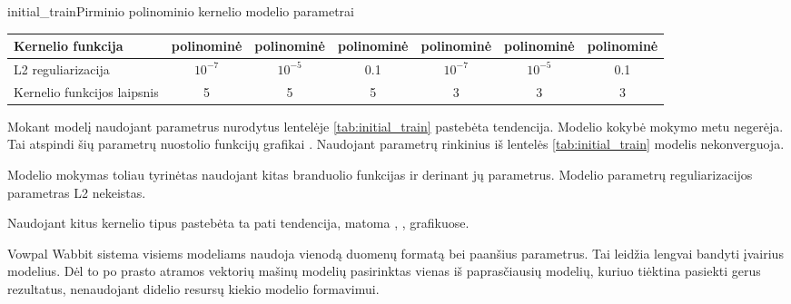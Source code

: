 \begin{ktutable}{initial_train}{Pirminio polinominio kernelio modelio parametrai}
    \begin{tabular}{| l | c | c | c | c | c | c | }
    \hline
        Kernelio funkcija & polinominė & polinominė & polinominė & polinominė & polinominė & polinominė \\ \hline
        L2 reguliarizacija & $10^{-7}$ & $10^{-5}$ & 0.1 & $10^{-7}$ & $10^{-5}$ & 0.1 \\ \hline
        Kernelio funkcijos laipsnis & 5 & 5 & 5 & 3 & 3 & 3 \\ \hline
    \end{tabular}
\end{ktutable}

Mokant modelį naudojant parametrus nurodytus lentelėje \vref{tab:initial_train} pastebėta tendencija. Modelio kokybė mokymo metu negerėja. Tai atspindi šių parametrų nuostolio funkcijų grafikai . Naudojant parametrų rinkinius iš lentelės \vref{tab:initial_train} modelis nekonverguoja.


Modelio mokymas toliau tyrinėtas naudojant kitas branduolio funkcijas ir derinant jų parametrus. Modelio parametrų reguliarizacijos parametras L2 nekeistas.


Naudojant kitus kernelio tipus pastebėta ta pati tendencija, matoma , ,  grafikuose.


Vowpal Wabbit sistema visiems modeliams naudoja vienodą duomenų formatą bei paanšius parametrus. Tai leidžia lengvai bandyti įvairius modelius. Dėl to po prasto atramos vektorių mašinų modelių pasirinktas vienas iš paprasčiausių modelių, kuriuo tiėktina pasiekti gerus rezultatus, nenaudojant didelio resursų kiekio modelio formavimui.


